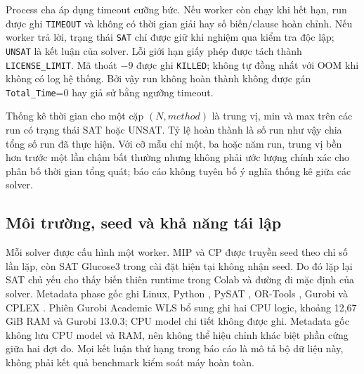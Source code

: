 Process cha áp dụng timeout cưỡng bức. Nếu worker còn chạy khi hết hạn,
run được ghi \texttt{TIMEOUT} và không có thời gian giải hay số biến/clause
hoàn chỉnh. Nếu worker trả lời, trạng thái \texttt{SAT} chỉ được giữ khi
nghiệm qua kiểm tra độc lập; \texttt{UNSAT} là kết luận của solver.
Lỗi giới hạn giấy phép được tách thành \texttt{LICENSE\_LIMIT}.
Mã thoát $-9$ được ghi \texttt{KILLED}; không tự đồng nhất với OOM khi
không có log hệ thống. Bởi vậy run không hoàn thành không được gán
\texttt{Total\_Time}=0 hay giả sử bằng ngưỡng timeout.

Thống kê thời gian cho một cặp $(N,method)$ là trung vị, min và max trên
các run có trạng thái SAT hoặc UNSAT. Tỷ lệ hoàn thành là số run như vậy
chia tổng số run đã thực hiện. Với cỡ mẫu chỉ một, ba hoặc năm run, trung
vị bền hơn trước một lần chậm bất thường nhưng không phải ước lượng chính
xác cho phân bố thời gian tổng quát; báo cáo không tuyên bố ý nghĩa thống
kê giữa các solver.

\subsection{Môi trường, seed và khả năng tái lập}

Mỗi solver được cấu hình một worker. MIP và CP được truyền seed theo chỉ
số lần lặp, còn SAT Glucose3 trong cài đặt hiện tại không nhận seed.
Do đó lặp lại SAT chủ yếu cho thấy biến thiên runtime trong Colab và
đường đi mặc định của solver. Metadata phase gốc ghi
Linux, Python \ResultPython{}, PySAT \ResultPySAT{}, OR-Tools
\ResultORTools{}, Gurobi \ResultGurobi{} và CPLEX \ResultCPLEX{}.
Phiên Gurobi Academic WLS bổ sung ghi hai CPU logic, khoảng 12{,}67 GiB
RAM và Gurobi 13.0.3; CPU model chi tiết không được ghi. Metadata gốc
không lưu CPU model và RAM, nên không thể hiệu chỉnh khác biệt phần cứng
giữa hai đợt đo. Mọi kết luận thứ hạng trong báo cáo là mô tả bộ dữ liệu
này, không phải kết quả benchmark kiểm soát máy hoàn toàn.
